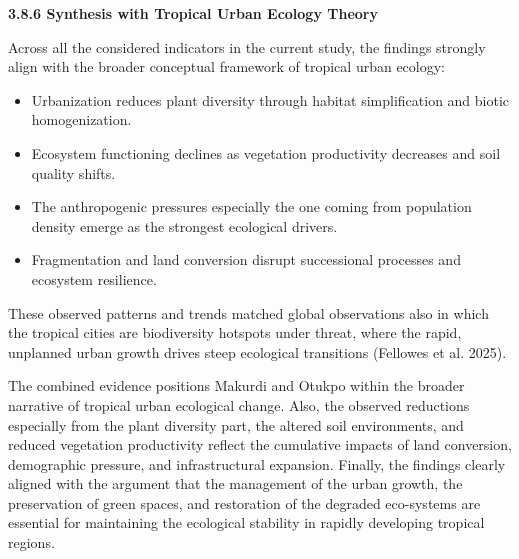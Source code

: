 {}\textbf{3.8.6 Synthesis with Tropical Urban Ecology Theory}

Across all the considered indicators in the current study, the findings strongly align with the broader conceptual framework of tropical urban ecology:

\begin{itemize}
\item
  Urbanization reduces plant diversity through habitat simplification and biotic homogenization.
\item
  Ecosystem functioning declines as vegetation productivity decreases and soil quality shifts.
\item
  The anthropogenic pressures especially the one coming from population density emerge as the strongest ecological drivers.
\item
  Fragmentation and land conversion disrupt successional processes and ecosystem resilience.
\end{itemize}

These observed patterns and trends matched global observations also in which the tropical cities are biodiversity hotspots under threat, where the rapid, unplanned urban growth drives steep ecological transitions (Fellowes et al. 2025).

The combined evidence positions Makurdi and Otukpo within the broader narrative of tropical urban ecological change. Also, the observed reductions especially from the plant diversity part, the altered soil environments, and reduced vegetation productivity reflect the cumulative impacts of land conversion, demographic pressure, and infrastructural expansion. Finally, the findings clearly aligned with the argument that the management of the urban growth, the preservation of green spaces, and restoration of the degraded eco-systems are essential for maintaining the ecological stability in rapidly developing tropical regions.


